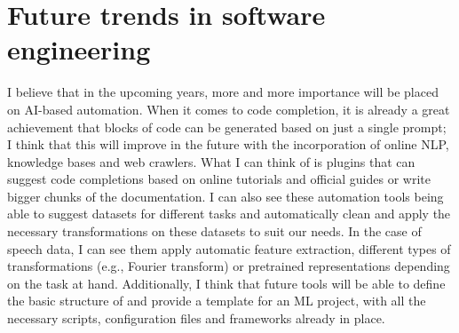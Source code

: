 \documentclass[11pt]{article}
\begin{document}
\section{Future trends in software engineering}

I believe that in the upcoming years, more and more importance will be placed on AI-based automation. When it comes to code completion, it is already a great achievement that blocks of code can be generated based on just a single prompt; I think that this will improve in the future with the incorporation of online NLP, knowledge bases and web crawlers. What I can think of is plugins that can suggest code completions based on online tutorials and official guides or write bigger chunks of the documentation. I can also see these automation tools being able to suggest datasets for different tasks and automatically clean and apply the necessary transformations on these datasets to suit our needs. In the case of speech data, I can see them apply automatic feature extraction, different types of transformations (e.g., Fourier transform) or pretrained representations depending on the task at hand. Additionally, I think that future tools will be able to define the basic structure of and provide a template for an ML project, with all the necessary scripts, configuration files and frameworks already in place.

\newpage


\end{document}
